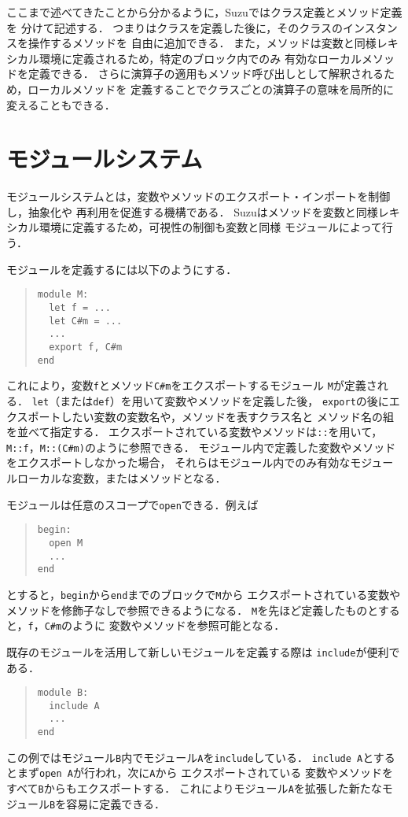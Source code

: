 \documentclass[a4paper,11pt,dvipdfmx]{jreport}
\begin{document}
ここまで述べてきたことから分かるように，Suzuではクラス定義とメソッド定義を
分けて記述する．
つまりはクラスを定義した後に，そのクラスのインスタンスを操作するメソッドを
自由に追加できる．
また，メソッドは変数と同様レキシカル環境に定義されるため，特定のブロック内でのみ
有効なローカルメソッドを定義できる．
さらに演算子の適用もメソッド呼び出しとして解釈されるため，ローカルメソッドを
定義することでクラスごとの演算子の意味を局所的に変えることもできる．

\section{モジュールシステム}

モジュールシステムとは，変数やメソッドのエクスポート・インポートを制御し，抽象化や
再利用を促進する機構である．
Suzuはメソッドを変数と同様レキシカル環境に定義するため，可視性の制御も変数と同様
モジュールによって行う．

モジュールを定義するには以下のようにする．
\begin{quote}
\begin{verbatim}
module M:
  let f = ...
  let C#m = ...
  ...
  export f, C#m
end
\end{verbatim}
\end{quote}
これにより，変数\verb|f|とメソッド\verb|C#m|をエクスポートするモジュール
\verb|M|が定義される．
\verb|let|（または\verb|def|）を用いて変数やメソッドを定義した後，
\verb|export|の後にエクスポートしたい変数の変数名や，メソッドを表すクラス名と
メソッド名の組を並べて指定する．
エクスポートされている変数やメソッドは\verb|::|を用いて，
\verb|M::f|，\verb|M::(C#m)|のように参照できる．
モジュール内で定義した変数やメソッドをエクスポートしなかった場合，
それらはモジュール内でのみ有効なモジュールローカルな変数，またはメソッドとなる．

モジュールは任意のスコープで\verb|open|できる．例えば
\begin{quote}
\begin{verbatim}
begin:
  open M
  ...
end
\end{verbatim}
\end{quote}
とすると，\verb|begin|から\verb|end|までのブロックで\verb|M|から
エクスポートされている変数やメソッドを修飾子なしで参照できるようになる．
\verb|M|を先ほど定義したものとすると，\verb|f|，\verb|C#m|のように
変数やメソッドを参照可能となる．

既存のモジュールを活用して新しいモジュールを定義する際は
\verb|include|が便利である．
\begin{quote}
\begin{verbatim}
module B:
  include A
  ...
end
\end{verbatim}
\end{quote}
この例ではモジュール\verb|B|内でモジュール\verb|A|を\verb|include|している．
\verb|include A|とするとまず\verb|open A|が行われ，次に\verb|A|から
エクスポートされている
変数やメソッドをすべて\verb|B|からもエクスポートする．
これによりモジュール\verb|A|を拡張した新たなモジュール\verb|B|を容易に定義できる．
\end{document}
